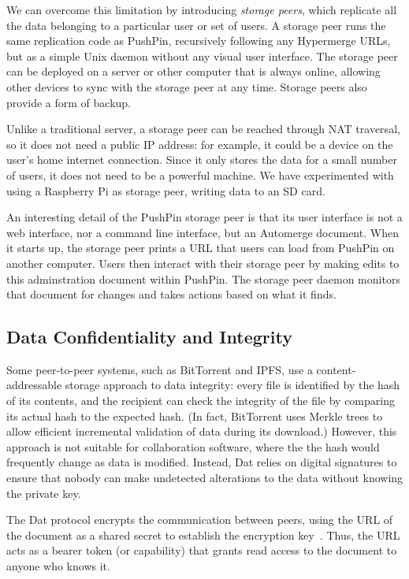 \documentclass[sigplan,10pt]{acmart}
\begin{document}
We can overcome this limitation by introducing \emph{storage peers}, which replicate all the data belonging to a particular user or set of users.
A storage peer runs the same replication code as PushPin, recursively following any Hypermerge URLs, but as a simple Unix daemon without any visual user interface.
The storage peer can be deployed on a server or other computer that is always online, allowing other devices to sync with the storage peer at any time.
Storage peers also provide a form of backup.

Unlike a traditional server, a storage peer can be reached through NAT traversal, so it does not need a public IP address: for example, it could be a device on the user's home internet connection.
Since it only stores the data for a small number of users, it does not need to be a powerful machine.
We have experimented with using a Raspberry Pi as storage peer, writing data to an SD card.

An interesting detail of the PushPin storage peer is that its user interface is not a web interface, nor a command line interface, but an Automerge document.
When it starts up, the storage peer prints a URL that users can load from PushPin on another computer.
Users then interact with their storage peer by making edits to this adminstration document within PushPin.
The storage peer daemon monitors that document for changes and takes actions based on what it finds.

\subsection{Data Confidentiality and Integrity}

Some peer-to-peer systems, such as BitTorrent and IPFS, use a content-addressable storage approach to data integrity: every file is identified by the hash of its contents, and the recipient can check the integrity of the file by comparing its actual hash to the expected hash.
(In fact, BitTorrent uses Merkle trees \cite{Merkle:1987} to allow efficient incremental validation of data during its download.)
However, this approach is not suitable for collaboration software, where the the hash would frequently change as data is modified.
Instead, Dat relies on digital signatures to ensure that nobody can make undetected alterations to the data without knowing the private key.

The Dat protocol encrypts the communication between peers, using the URL of the document as a shared secret to establish the encryption key~\cite{HowDatWorks}.
Thus, the URL acts as a bearer token (or capability) that grants read access to the document to anyone who knows it.
\end{document}
